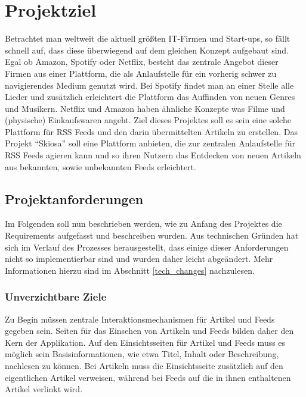 
\chapter{Projektziel}

Betrachtet man weltweit die aktuell größten IT-Firmen und Start-ups, so fällt schnell auf, dass diese überwiegend auf dem gleichen Konzept aufgebaut sind.
Egal ob Amazon, Spotify oder Netflix, besteht das zentrale Angebot dieser Firmen aus einer Plattform, die als Anlaufstelle für ein vorherig schwer zu navigierendes Medium genutzt wird.
Bei Spotify findet man an einer Stelle alle Lieder und zusätzlich erleichtert die Plattform das Auffinden von neuen Genres und Musikern.
Netflix und Amazon haben ähnliche Konzepte was Filme und (physische) Einkaufswaren angeht.
Ziel dieses Projektes soll es sein eine solche Plattform für RSS Feeds und den darin übermittelten Artikeln zu erstellen.
Das Projekt \enquote{Skiosa} soll eine Plattform anbieten, die zur zentralen Anlaufstelle für RSS Feeds agieren kann und so ihren Nutzern das Entdecken von neuen Artikeln aus bekannten, sowie unbekannten Feeds erleichtert.

\section{Projektanforderungen}
Im Folgenden soll nun beschrieben werden, wie zu Anfang des Projektes die Requirements aufgefasst und beschreiben wurden.
Aus technischen Gründen hat sich im Verlauf des Prozesses herausgestellt, dass einige dieser Anforderungen nicht so implementierbar sind und wurden daher leicht abgeändert.
Mehr Informationen hierzu sind im Abschnitt \ref{tech_changes} nachzulesen.

\subsection{Unverzichtbare Ziele}
Zu Begin müssen zentrale Interaktionsmechanismen für Artikel und Feeds gegeben sein.
Seiten für das Einsehen von Artikeln und Feeds bilden daher den Kern der Applikation.
Auf den Einsichtsseiten für Artikel und Feeds muss es möglich sein Basisinformationen, wie etwa Titel, Inhalt oder Beschreibung, nachlesen zu können.
Bei Artikeln muss die Einsichtsseite zusätzlich auf den eigentlichen Artikel verweisen, während bei Feeds auf die in ihnen enthaltenen Artikel verlinkt wird.

